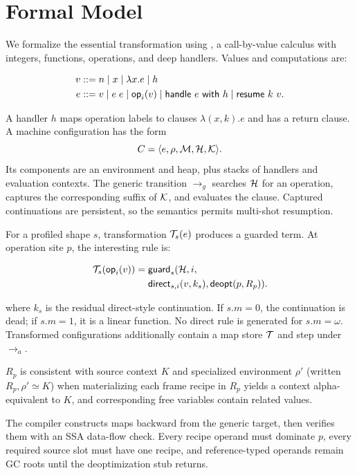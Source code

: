 \section{Formal Model}
\label{sec:formal}

We formalize the essential transformation using \lang, a call-by-value
calculus with integers, functions, operations, and deep handlers. Values and
computations are:

\begin{align*}
v &::= n \mid x \mid \lambda x.e \mid h \\
e &::= v \mid e\;e \mid \mathsf{op}_i(v) \mid
      \mathsf{handle}\ e\ \mathsf{with}\ h \mid \mathsf{resume}\ k\ v .
\end{align*}

A handler $h$ maps operation labels to clauses $\lambda(x,k).e$ and has a
return clause. A machine configuration has the form
\[
  C = \langle e,\rho,\mathcal{M},\mathcal{H},\mathcal{K}\rangle .
\]
Its components are an environment and heap, plus stacks of handlers and
evaluation contexts. The generic transition $\longrightarrow_g$ searches $\mathcal{H}$ for an
operation, captures the corresponding suffix of $\mathcal{K}$, and evaluates the
clause. Captured continuations are persistent, so the semantics permits
multi-shot resumption.

For a profiled shape $s$, transformation $\mathcal{T}_s(e)$ produces a guarded
term. At operation site $p$, the interesting rule is:

\begin{equation}
\begin{aligned}
\mathcal{T}_s(\mathsf{op}_i(v)) ={}& \mathsf{guard}_s(\mathcal{H},i, \\
  &\mathsf{direct}_{s,i}(v,k_s),\mathsf{deopt}(p,R_p)).
\end{aligned}
\label{eq:transform}
\end{equation}

where $k_s$ is the residual direct-style continuation. If $s.m=0$, the
continuation is dead; if $s.m=1$, it is a linear function. No direct rule is
generated for $s.m=\omega$. Transformed configurations additionally contain a
map store $\mathcal{T}$ and step under $\longrightarrow_a$.

\begin{definition}
$R_p$ is consistent with source context $K$ and specialized environment
$\rho'$ (written $R_p,\rho'\simeq K$) when materializing each frame recipe in
$R_p$ yields a context alpha-equivalent to $K$, and corresponding free
variables contain related values.
\end{definition}

The compiler constructs maps backward from the generic target, then verifies
them with an SSA data-flow check. Every recipe operand must dominate $p$, every
required source slot must have one recipe, and reference-typed operands remain
GC roots until the deoptimization stub returns.
